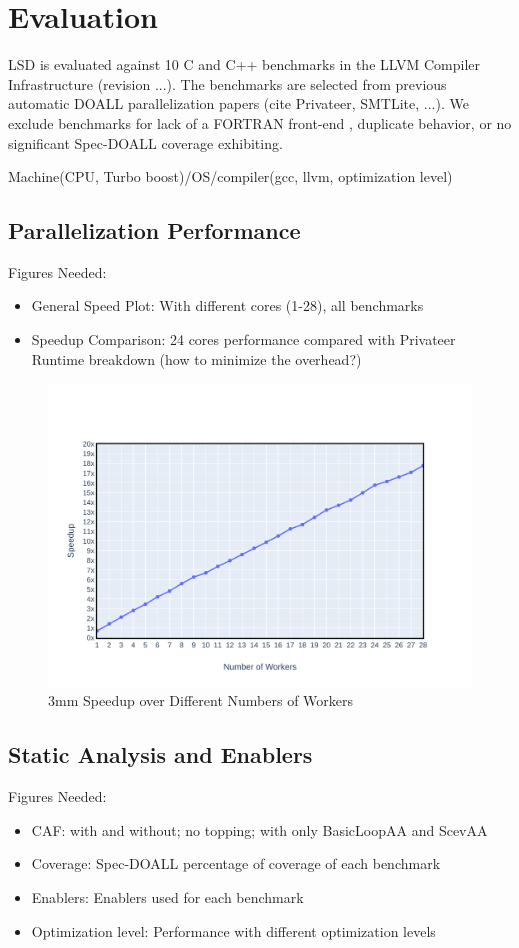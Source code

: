 \section{Evaluation}

LSD is evaluated against 10 C and C++ benchmarks in the LLVM Compiler
Infrastructure (revision ...). The benchmarks are selected from previous
automatic DOALL parallelization papers (cite Privateer, SMTLite, ...). We
exclude benchmarks for lack of a FORTRAN front-end , duplicate behavior, or
no significant Spec-DOALL coverage exhibiting.

Machine(CPU, Turbo boost)/OS/compiler(gcc, llvm, optimization level)


\subsection{Parallelization Performance}
Figures Needed:
\begin{itemize}
\item General Speed Plot: With different cores (1-28), all benchmarks
\item Speedup Comparison: 24 cores performance compared with Privateer
Runtime breakdown (how to minimize the overhead?)

\end{itemize}

\begin{figure}[htp]
  \includegraphics[width=\textwidth]{figures/3mm-scale-crop}
  \caption{3mm Speedup over Different Numbers of Workers}
  \label{fig:3mm-scale}
\end{figure}


\subsection{Static Analysis and Enablers}
Figures Needed:
\begin{itemize}
\item CAF: with and without; no topping; with only BasicLoopAA and ScevAA
\item Coverage: Spec-DOALL percentage of coverage of each benchmark
\item Enablers: Enablers used for each benchmark
\item Optimization level: Performance with different optimization levels
\end{itemize}

